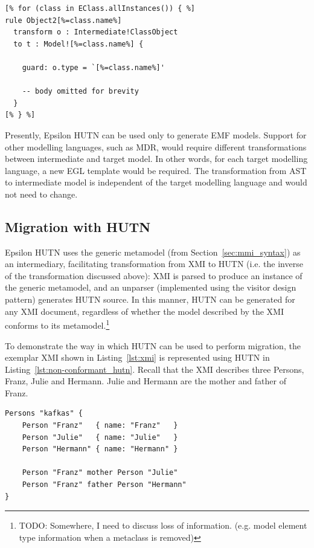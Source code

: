 \begin{lstlisting}[caption= Initial sections of the template (in EGL) for generating  rules (in ETL) to instantiate classes of the target metamodel., label=lst:generate, language=EOL]
[% for (class in EClass.allInstances()) { %]
rule Object2[%=class.name%]
  transform o : Intermediate!ClassObject
  to t : Model![%=class.name%] {

    guard: o.type = `[%=class.name%]'

    -- body omitted for brevity
  }
[% } %]
\end{lstlisting}

Presently, Epsilon HUTN can be used only to generate EMF models. Support for other modelling languages, such as MDR, would require different transformations between intermediate and target model. In other words, for each target modelling language, a new EGL template would be required. The transformation from AST to intermediate model is independent of the target modelling language and would not need to change.


\subsection{Migration with HUTN}
\label{subsec:migration_with_hutn}
Epsilon HUTN uses the generic metamodel (from Section~\ref{sec:mmi_syntax}) as an intermediary, facilitating transformation from XMI to HUTN (i.e. the inverse of the transformation discussed above): XMI is parsed to produce an instance of the generic metamodel, and an unparser (implemented using the visitor design pattern) generates HUTN source. In this manner, HUTN can be generated for any XMI document, regardless of whether the model described by the XMI conforms to its metamodel.\footnote{TODO: Somewhere, I need to discuss loss of information. (e.g. model element type information when a metaclass is removed)}

To demonstrate the way in which HUTN can be used to perform migration, the exemplar XMI shown in Listing~\ref{lst:xmi} is represented using HUTN in Listing~\ref{lst:non-conformant_hutn}. Recall that the XMI describes three Persons, Franz, Julie and Hermann. Julie and Hermann are the mother and father of Franz.

\begin{lstlisting}[caption=Exemplar HUTN document., label=lst:non-conformant_hutn, language=HutnFamilies]
Persons "kafkas" {
    Person "Franz"   { name: "Franz"   }
    Person "Julie"   { name: "Julie"   }
    Person "Hermann" { name: "Hermann" }
    
    Person "Franz" mother Person "Julie"
    Person "Franz" father Person "Hermann"
}
\end{lstlisting}

